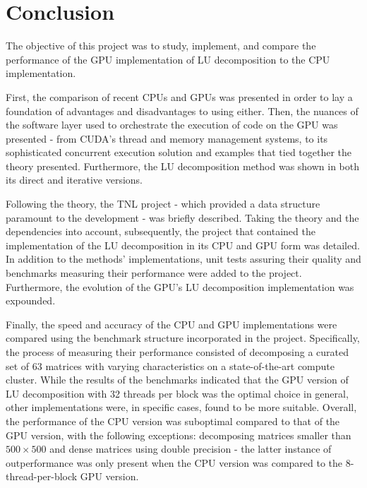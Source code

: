 \chapter*{Conclusion \TO}				   %

The objective of this project was to study, implement, and compare the performance of the GPU implementation of LU decomposition to the CPU implementation.
\par First, the comparison of recent CPUs and GPUs was presented in order to lay a foundation of advantages and disadvantages to using either. Then, the nuances of the software layer used to orchestrate the execution of code on the GPU was presented - from CUDA's thread and memory management systems, to its sophisticated concurrent execution solution and examples that tied together the theory presented. Furthermore, the LU decomposition method was shown in both its direct and iterative versions.
\par Following the theory, the TNL project - which provided a data structure paramount to the development - was briefly described. Taking the theory and the dependencies into account, subsequently, the project that contained the implementation of the LU decomposition in its CPU and GPU form was detailed. In addition to the methods' implementations, unit tests assuring their quality and benchmarks measuring their performance were added to the project. Furthermore, the evolution of the GPU's LU decomposition implementation was expounded.
\par Finally, the speed and accuracy of the CPU and GPU implementations were compared using the benchmark structure incorporated in the project. Specifically, the process of measuring their performance consisted of decomposing a curated set of 63 matrices with varying characteristics on a state-of-the-art compute cluster. While the results of the benchmarks indicated that the GPU version of LU decomposition with 32 threads per block was the optimal choice in general, other implementations were, in specific cases, found to be more suitable. Overall, the performance of the CPU version was suboptimal compared to that of the GPU version, with the following exceptions: decomposing matrices smaller than $ 500\times 500 $ and dense matrices using double precision - the latter instance of outperformance was only present when the CPU version was compared to the 8-thread-per-block GPU version.
